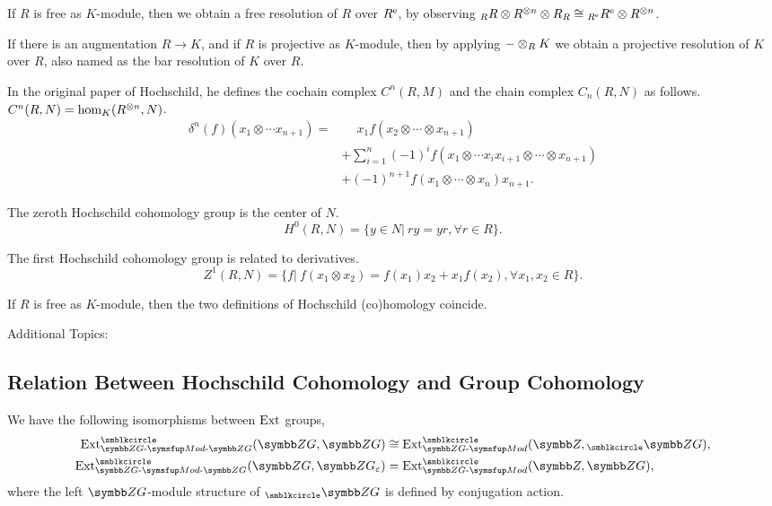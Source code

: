 If $R$ is free as $K$-module, then we obtain a free resolution of $R$ over $R^{\textrm{e}}$, by observing ${}_{R}R\otimes R^{\otimes n}\otimes R_{R}\cong {}_{R^{\textrm{e}}}R^{\textrm{e}}\otimes R^{\otimes n}$.

If there is an augmentation $R\to K$, and if $R$ is projective as $K$-module, then by applying ${-}\otimes_{R}K$ we obtain a projective resolution of $K$ over $R$, also named as the bar resolution of $K$ over $R$.

In the original paper of Hochschild, he defines the cochain complex $C^n(R, M)$ and the chain complex $C_n(R, N)$ as follows. $C^n(R, N)=\operatorname{hom}_K(R^{\otimes n}, N)$.
\begin{equation*}
  \begin{aligned}
    \delta^n(f)(x_1\otimes\dotsb x_{n+1})
    =&\phantom{{}+{}}x_1f(x_2\otimes\dotsb\otimes x_{n+1})\\
    &+\sum_{i=1}^n(-1)^if(x_1\otimes\dotsb x_ix_{i+1}\otimes\dotsb\otimes x_{n+1})\\
    &+(-1)^{n+1}f(x_1\otimes\dotsb\otimes x_n)x_{n+1}.
  \end{aligned}
\end{equation*}%

The zeroth Hochschild cohomology group is the center of $N$.
\begin{equation*}
  H^0(R, N)=\{y\in N\vert\ ry=yr, \forall r\in R\}.
\end{equation*}

The first Hochschild cohomology group is related to derivatives.
\begin{equation*}
  Z^1(R, N)=\{f\vert\ f(x_1\otimes x_2)=f(x_1)x_2+x_1f(x_2), \forall x_1, x_2\in R\}.
\end{equation*}

If $R$ is free as $K$-module, then the two definitions of Hochschild (co)homology coincide.

Additional Topics:

\subsection{Relation Between Hochschild Cohomology and Group Cohomology}

\begin{proposition}
  We have the following isomorphisms between $\operatorname{Ext}$ groups,
  \begin{equation*}
    \begin{aligned}
      \EXT_{\BIMOD{\ZG}{\ZG}}^\BCIR(\ZG, \ZG) &\cong \EXT_{\ZG{\textnormal-}\MOD}^\BCIR(\ZZ, {}_{\BCIR}\ZG),\\
      \EXT^\BCIR_{\BIMOD{\ZG}{\ZG}}(\ZG, \ZG_{\varepsilon}) &= \EXT^\BCIR_{\ZG{\textnormal-}\MOD}(\ZZ, \ZG),
    \end{aligned}
  \end{equation*}
  where the left $\ZG$-module structure of ${}_{\BCIR}\ZG$ is defined by conjugation action.
\end{proposition}
